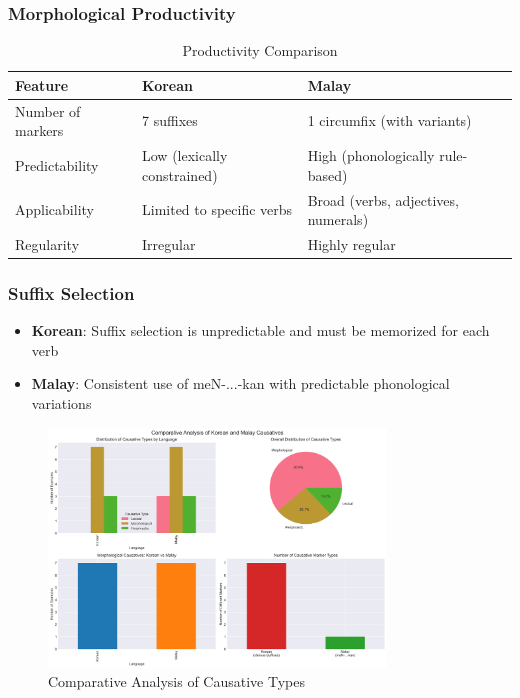 \documentclass[12pt,a4paper]{article}
\begin{document}
\subsubsection{Morphological Productivity}
\begin{table}[h]
\centering
\caption{Productivity Comparison}
\begin{tabular}{|l|l|l|}
\hline
\textbf{Feature} & \textbf{Korean} & \textbf{Malay} \\
\hline
Number of markers & 7 suffixes & 1 circumfix (with variants) \\
Predictability & Low (lexically constrained) & High (phonologically rule-based) \\
Applicability & Limited to specific verbs & Broad (verbs, adjectives, numerals) \\
Regularity & Irregular & Highly regular \\
\hline
\end{tabular}
\end{table}

\subsubsection{Suffix Selection}
\begin{itemize}
\item \textbf{Korean}: Suffix selection is unpredictable and must be memorized for each verb
\item \textbf{Malay}: Consistent use of meN-...-kan with predictable phonological variations
\end{itemize}

\begin{figure}[h]
\centering
\includegraphics[width=0.8\textwidth]{../analysis/causative_comparison.png}
\caption{Comparative Analysis of Causative Types}
\end{figure}
\end{document}

